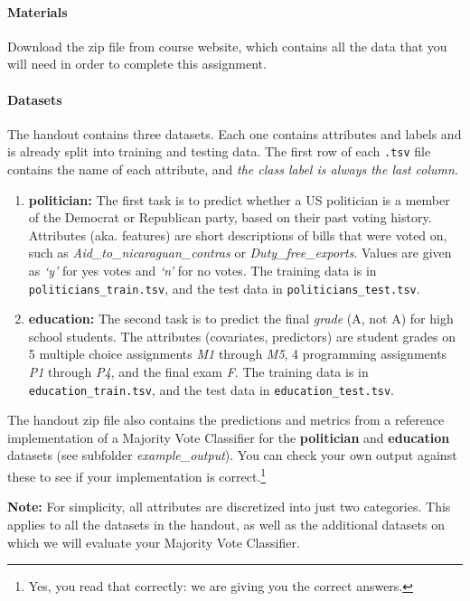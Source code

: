 \documentclass[11pt,addpoints,answers]{exam}
\begin{document}
\paragraph{Materials} Download the zip file from course website, which contains all the data that you will need in order to complete this assignment.

\paragraph{Datasets}

The handout contains three datasets. Each one contains attributes and labels and is already split into training and testing data. The first row of each \lstinline{.tsv} file contains the name of each attribute, and \emph{the class label is always the last column}.

\begin{enumerate}
\item \textbf{politician:}
    The first task is to predict whether a US politician is a member of the Democrat or Republican party, based on their past voting history. Attributes (aka. features) are short descriptions of bills that were voted on, such as \emph{Aid\_to\_nicaraguan\_contras} or \emph{Duty\_free\_exports}. Values are given as \emph{`y'} for yes votes and \emph{`n'} for no votes. The training data is in \lstinline{politicians_train.tsv}, and the test data in \lstinline{politicians_test.tsv}.
\item \textbf{education:}
    The second task is to predict the final \emph{grade} (A, not A) for high school students. The attributes (covariates, predictors) are student grades on 5 multiple choice assignments \emph{M1} through \emph{M5}, 4 programming assignments \emph{P1} through \emph{P4}, and the final exam \emph{F}. The training data is in \newline \lstinline{education_train.tsv}, and the test data in \lstinline{education_test.tsv}.
\end{enumerate}
    The handout zip file also contains the predictions and metrics from a reference implementation of a Majority Vote Classifier for the \textbf{politician} and \textbf{education} datasets (see subfolder \emph{example\_output}). You can check your own output against these to see if your implementation is correct.\footnote{Yes, you read that correctly: we are giving you the correct answers.}

\begin{notebox} \textbf{Note:}
For simplicity, all attributes are discretized into just two categories. This applies to all the datasets in the handout, as well as the additional datasets on which we will evaluate your Majority Vote Classifier.
\end{notebox}
\end{document}
